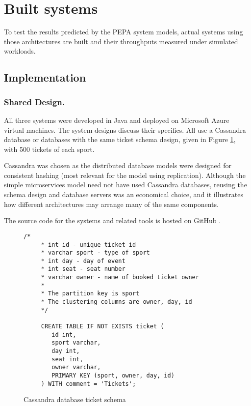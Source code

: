 %
%

\section{Built systems}\label{sec:built-systems}

To test the results predicted by the PEPA system models, actual systems using those architectures are built and their throughputs measured under simulated workloads.

\subsection{Implementation}

\subsubsection{Shared Design.}  All three systems were developed in Java and deployed on Microsoft Azure virtual machines.  The system designs discuss their specifics.  All use a Cassandra database or databases with the same ticket schema design, given in Figure \ref{figure:cassandra_ticket_schema}, with 500 tickets of each sport.

Cassandra was chosen as the distributed database models were designed for consistent hashing (most relevant for the model using replication).  Although the simple microservices model need not have used Cassandra databases, reusing the schema design and database servers was an economical choice, and it illustrates how different architectures may arrange many of the same components.

The source code for the systems and related tools is hosted on GitHub \cite{RN1073}.

\begin{figure}
	\centering
	\begin{lstlisting}[basicstyle=\ttfamily]
	/*
	 * int id - unique ticket id
	 * varchar sport - type of sport
	 * int day - day of event
	 * int seat - seat number
	 * varchar owner - name of booked ticket owner
	 * 
	 * The partition key is sport
	 * The clustering columns are owner, day, id
	 */
	
	 CREATE TABLE IF NOT EXISTS ticket (
		id int,
		sport varchar,
		day int,
		seat int,
		owner varchar,
		PRIMARY KEY (sport, owner, day, id)
	 ) WITH comment = 'Tickets';
	\end{lstlisting}
	\caption{Cassandra database ticket schema}
	\label{figure:cassandra_ticket_schema}
\end{figure}

